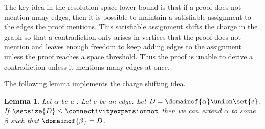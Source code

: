 \documentclass[11pt]{article}
\numberwithin{equation}{section}
\newtheorem{lemma}[theorem]{Lemma}
\theoremstyle{definition}
\theoremstyle{plain}
\begin{document}
The key idea in the resolution space lower bound is that if a proof does not mention many edges, then it is possible to maintain a satisfiable assignment to the edges the proof mentions. This satisfiable assignment shifts the charge in the graph so that a contradiction only arises in vertices that the proof does not mention and leaves enough freedom to keep adding edges to the assignment unless the proof reaches a space threshold. Thus the proof is unable to derive a contradiction unless it mentions many edges at once.

The following lemma implements the charge shifting idea. 

\begin{lemma}
  \label{lem:extend-non-splitting}
  Let $\alpha$ be a \nonsplittingassignment. Let $e$ be an edge. Let $D=\domainof{\alpha}\union\set{e}$. If $\setsize{D}\leq \connectivityexpansionnot$ then we can extend $\alpha$ to some \nonsplittingassignment $\beta$ such that $\domainof{\beta}=D$.
\end{lemma}
\end{document}
